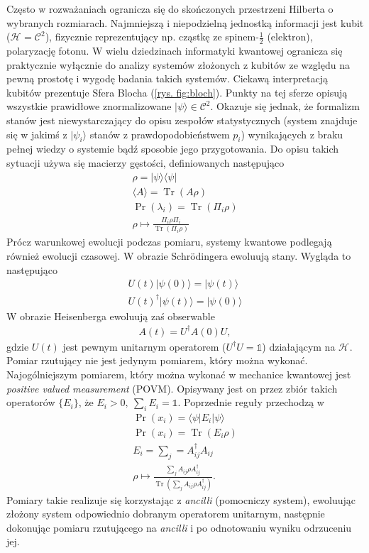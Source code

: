 \documentclass[10pt]{article} %
\DeclareMathOperator{\Trs}{Tr}
\newcommand{\Hx}[1]{\mathcal{H}^{#1}}
\newcommand{\Tr}[1]{\Trs(#1)}
\newcommand{\Pro}[1]{\Pr(#1)}
\newcommand{\Ket}[1]{|#1\rangle}
\newcommand{\Bra}[1]{\langle#1|}
\newcommand{\Braket}[1]{\langle#1\rangle}
\newcommand{\KP}{\Ket{\psi}}
\newcommand{\BP}{\Bra{\psi}}
\begin{document}
Często w rozważaniach ogranicza się do skończonych przestrzeni Hilberta o wybranych rozmiarach. Najmniejszą i niepodzielną jednostką informacji jest kubit ($\Hx{} = \mathcal{C}^2$), fizycznie reprezentujący np. cząstkę ze spinem-$\frac{1}{2}$ (elektron), polaryzację fotonu. W wielu dziedzinach informatyki kwantowej ogranicza się praktycznie wyłącznie do analizy systemów złożonych z kubitów ze względu
na pewną prostotę i wygodę badania takich systemów. Ciekawą interpretacją kubitów prezentuje Sfera Blocha (\ref{rys. fig:bloch}). Punkty na tej sferze opisują wszystkie prawidłowe znormalizowane $\KP \in \mathcal{C}^2$.
Okazuje się jednak, że formalizm stanów jest niewystarczający do opisu zespołów statystycznych (system znajduje się w jakimś z $\Ket{\psi_i}$ stanów z prawdopodobieństwem $p_i$) wynikających z braku pełnej wiedzy o systemie bądź sposobie jego przygotowania. Do opisu takich sytuacji używa się macierzy gęstości, definiowanych następująco
\begin{gather}
\rho = \KP \BP \\
\Braket{A} = \Tr{A\rho} \\
\Pro{\lambda_i} = \Tr{\Pi_i \rho}\\
\rho \mapsto \frac{\Pi_i\rho\Pi_i}{\Trs(\Pi_i\rho)}
\end{gather}
Prócz warunkowej ewolucji podczas pomiaru, systemy kwantowe podlegają również ewolucji czasowej. W obrazie Schrödingera ewoluują stany. Wygląda to następująco
\begin{gather}
U(t)\Ket{\psi(0)} = \Ket{\psi(t)} \\
U(t)^\dag\Ket{\psi(t)} = \Ket{\psi(0)}
\end{gather}
W obrazie Heisenberga ewoluują zaś obserwable
\begin{gather}
A(t) = U^\dag A(0)U,
\end{gather}
gdzie $U(t)$ jest pewnym unitarnym operatorem ($U^\dag U = \mathbb{1}$) działającym na $\Hx{}$. Pomiar rzutujący nie jest jedynym pomiarem, który można wykonać. Najogólniejszym pomiarem, który można wykonać w mechanice kwantowej jest \textit{positive valued measurement} (POVM). Opisywany jest on przez
zbiór takich operatorów $\{E_i\}$, że $E_i > 0,~\sum_i E_i = \mathbb{1}$. Poprzednie reguły przechodzą w
\begin{gather}
\Pro{x_i} = \Bra{\psi} E_i \Ket{\psi}\\
\Pro{x_i} = \Tr{E_i \rho} \\
E_i = \sum_j = A^\dag_{ij}A_{ij} \\ 
\rho \mapsto \frac{\sum_j A_{ij} \rho A^\dag_{ij}}{\Tr{\sum_j A_{ij} \rho A^\dag_{ij}}}.
\end{gather} Pomiary takie realizuje się korzystając z \textit{ancilli} (pomocniczy system), ewoluując złożony system odpowiednio dobranym operatorem unitarnym, następnie dokonując pomiaru rzutującego na \textit{ancilli} i po odnotowaniu wyniku odrzuceniu jej.
\end{document}
